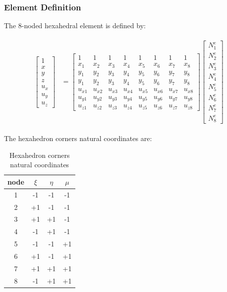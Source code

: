 \documentclass[10pt,b5paper,titlepage]{book}
\newenvironment{eqarray}
{
    \begin{eqnarray}
        \begin{aligned}
}
{
        \end{aligned}
    \end{eqnarray}
}
\begin{document}
\subsubsection{Element Definition}

The 8-noded hexahedral element is defined by:

\begin{eqarray}
    \begin{bmatrix}
        1\\
        x\\
        y\\
        z\\
        u_x\\
        u_y\\
        u_z
    \end{bmatrix} &=
    \begin{bmatrix}
        1 & 1 & 1 & 1 & 1 & 1 & 1 & 1\\
        x_1 & x_2 & x_3 & x_4 & x_5 & x_6 & x_7 & x_8\\
        y_1 & y_2 & y_3 & y_4 & y_5 & y_6 & y_7 & y_8\\
        y_1 & y_2 & y_3 & y_4 & y_5 & y_6 & y_7 & y_8\\
        u_{x1} & u_{x2} & u_{x3} & u_{x4} & u_{x5} & u_{x6} & u_{x7} & u_{x8}\\
        u_{y1} & u_{y2} & u_{y3} & u_{y4} & u_{y5} & u_{y6} & u_{y7} & u_{y8}\\
        u_{z1} & u_{z2} & u_{z3} & u_{z4} & u_{z5} & u_{z6} & u_{z7} & u_{z8}
    \end{bmatrix}
    \begin{bmatrix}
        N_1^e\\
        N_2^e\\
        N_3^e\\
        N_4^e\\
        N_5^e\\
        N_6^e\\
        N_7^e\\
        N_8^e
    \end{bmatrix}
\end{eqarray}

The hexahedron corners natural coordinates are:

\begin{table}[ht]
    \centering
    \begin{tabular}{|c c c c|}
        \hline
        node & $\xi$ & $\eta$ & $\mu$\\
        \hline
        1 & -1 & -1 & -1\\
        2 & +1 & -1 & -1\\
        3 & +1 & +1 & -1\\
        4 & -1 & +1 & -1\\
        5 & -1 & -1 & +1\\
        6 & +1 & -1 & +1\\
        7 & +1 & +1 & +1\\
        8 & -1 & +1 & +1\\
        \hline
    \end{tabular}\\
    \caption{Hexahedron corners natural coordinates}
\end{table}
\end{document}
